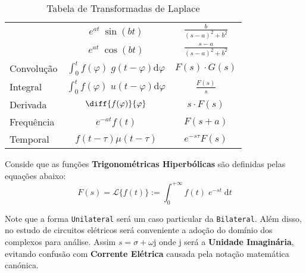 \documentclass{article}
\begin{document}
\begin{multicols}{2}
\begin{table}[H]
\begin{tabular}[]{lcc}
                                         & $e^{at}\;\sin(bt)$  & $\frac{b}{(s-a)^2+b^2}$\\
                                         & $e^{at}\;\cos(bt)$  & $\frac{s-a}{(s-a)^2+b^2}$\\
                        Convolução       & $\int_{0}^{t} f(\varphi)\;g(t - \varphi) \text{d}\varphi$ & $F(s)\cdot G(s)$\\
                        Integral         & $\int_{0}^{t} f(\varphi)\;u(t - \varphi) \text{d}\varphi$ & $\frac{F(s)}{s}$\\
                        Derivada         & $\diff{f(\varphi)}{\varphi}$ & $s\cdot F(s)$\\
                        Frequência       & $e^{-at}f(t)$          & $F(s+a)$\\
                        Temporal         & $f(t-\tau)\mu(t-\tau)$ & $e^{-s\tau}F(s)$\\\hline
                    \end{tabular}
                    \endgroup
                    \caption{Tabela de Transformadas de Laplace}\label{table:Laplace}
                \end{table} \noindent
            Conside que as funções \textbf{Trigonométricas Hiperbólicas} são definidas pelas equações abaixo:
                \begin{equation}
                    \boxed{
                        F(s) = \mathcal{L}\{ f(t) \} := \int_{0}^{+\infty} f(t) \; e^{-st} \; \text{d} t
                    }
                \end{equation}
        \end{multicols}\noindent
        Note que a forma \texttt{Unilateral} será um caso particular da \texttt{Bilateral}. Além disso, no estudo de circuitos elétricos será conveniente a adoção do domínio dos complexos para análise. Assim $s = \sigma + \omega\text{j}$ onde $\text{j}$ será a \textbf{Unidade Imaginária}, evitando confusão com \textbf{Corrente Elétrica} causada pela notação matemática canónica.
\end{document}
